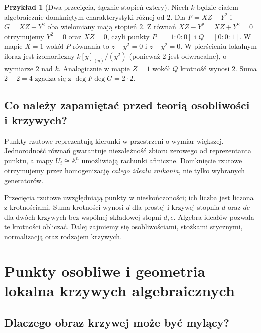 \documentclass[11pt,a4paper,openany]{report}
\numberwithin{equation}{section}
\theoremstyle{plain}
\theoremstyle{definition}
\newtheorem{przyklad}[twierdzenie]{Przykład}
\theoremstyle{remark}
\newcommand{\A}{\mathbb A}
\begin{document}
\begin{przyklad}[Dwa przecięcia, łącznie stopień cztery]
Niech $k$ będzie ciałem algebraicznie domkniętym
charakterystyki różnej od $2$. Dla $F=XZ-Y^2$
i $G=XZ+Y^2$ oba wielomiany mają
stopień $2$. Z równań $XZ-Y^2=XZ+Y^2=0$
otrzymujemy $Y^2=0$ oraz $XZ=0$, czyli punkty
$P=[1:0:0]$ i $Q=[0:0:1]$. W mapie $X=1$ wokół $P$
równania to $z-y^2=0$ i $z+y^2=0$.
W pierścieniu lokalnym iloraz jest izomorficzny
$k[y]_{(y)}/(y^2)$ (ponieważ $2$ jest odwracalne),
o wymiarze $2$ nad $k$. Analogicznie w mapie $Z=1$
wokół $Q$ krotność wynosi $2$. Suma $2+2=4$ zgadza się
z $\deg F\deg G=2\cdot2$.
\end{przyklad}

\section{Co należy zapamiętać przed teorią osobliwości i krzywych?}

Punkty rzutowe reprezentują kierunki w przestrzeni o wymiar
większej. Jednorodność równań gwarantuje niezależność zbioru
zerowego od reprezentanta punktu, a mapy
$U_i\cong\A^n$ umożliwiają rachunki afiniczne.
Domknięcie rzutowe otrzymujemy przez homogenizację
\emph{całego ideału znikania}, nie tylko wybranych generatorów.

Przecięcia rzutowe uwzględniają punkty w nieskończoności;
ich liczba jest liczona z krotnościami. Suma krotności wynosi
$d$ dla prostej i krzywej stopnia $d$ oraz $de$ dla dwóch
krzywych bez wspólnej składowej stopni $d,e$.
Algebra ideałów pozwala te krotności obliczać.
Dalej zajmiemy się osobliwościami, stożkami stycznymi,
normalizacją oraz rodzajem krzywych.


\chapter{Punkty osobliwe i geometria lokalna krzywych algebraicznych}
\label{ch:osobliwosci}

\providecommand{\atlasref}[2]{#2}


\section{Dlaczego obraz krzywej może być mylący?}
\end{document}
